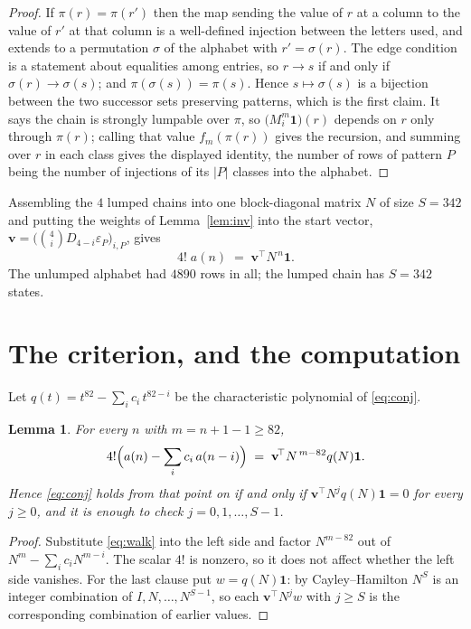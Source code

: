 \documentclass[11pt,a4paper]{article}
\theoremstyle{plain}
\newtheorem{lemma}[theorem]{Lemma}
\theoremstyle{definition}
\begin{document}
\begin{proof}
If $\pi(r)=\pi(r')$ then the map sending the value of $r$ at a column to the value of $r'$
at that column is a well-defined injection between the letters used, and extends to a
permutation $\sigma$ of the alphabet with $r'=\sigma(r)$. The edge condition is a statement
about equalities among entries, so $r\to s$ if and only if $\sigma(r)\to\sigma(s)$; and
$\pi(\sigma(s))=\pi(s)$. Hence $s\mapsto\sigma(s)$ is a bijection between the two successor
sets preserving patterns, which is the first claim. It says the chain is strongly lumpable
over $\pi$, so $\bigl(M_i^{m}\mathbf{1}\bigr)(r)$ depends on $r$ only through $\pi(r)$;
calling that value $f_m(\pi(r))$ gives the recursion, and summing over $r$ in each class
gives the displayed identity, the number of rows of pattern $P$ being the number of
injections of its $|P|$ classes into the alphabet.
\end{proof}

Assembling the $4$ lumped chains into one block-diagonal matrix $N$ of size $S=342$ and
putting the weights of Lemma~\ref{lem:inv} into the start vector,
$\mathbf{v}=\bigl(\binom{4}{i}D_{4-i}\varepsilon_P\bigr)_{i,P}$, gives
\begin{equation}\label{eq:walk}
4!\;a(n)\;=\;\mathbf{v}^{\!\top}N^{\,n}\mathbf{1} .
\end{equation}
The unlumped alphabet had $4890$ rows in all; the lumped chain has $S=342$ states.

\section{The criterion, and the computation}

Let $q(t)=t^{82}-\sum_i c_i\,t^{82-i}$ be the characteristic polynomial of
\eqref{eq:conj}.

\begin{lemma}\label{lem:crit}
For every $n$ with $m=n+1-1\ge82$,
\[
4!\Bigl(a(n)-\sum_i c_i\,a(n-i)\Bigr)\;=\;\mathbf{v}^{\!\top}N^{\,m-82}q(N)\mathbf{1} .
\]
Hence \eqref{eq:conj} holds from that point on if and only if
$\mathbf{v}^{\!\top}N^{j}q(N)\mathbf{1}=0$ for every $j\ge0$, and it is enough to check
$j=0,1,\dots,S-1$.
\end{lemma}

\begin{proof}
Substitute \eqref{eq:walk} into the left side and factor $N^{m-82}$ out of
$N^{m}-\sum_i c_iN^{m-i}$. The scalar $4!$ is nonzero, so it does not affect whether
the left side vanishes. For the last clause put $w=q(N)\mathbf{1}$: by Cayley--Hamilton
$N^{S}$ is an integer combination of $I,N,\dots,N^{S-1}$, so each
$\mathbf{v}^{\!\top}N^{j}w$ with $j\ge S$ is the corresponding combination of earlier
values.
\end{proof}
\end{document}
